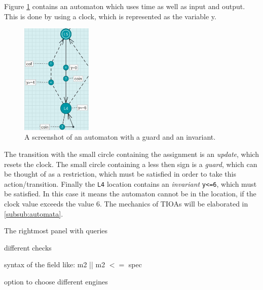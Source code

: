 Figure \ref{fig:ECDAR-guard} contains an automaton which uses time as well as input and output.
This is done by using a clock, which is represented as the variable y.
\begin{figure}[H]
    \centering
    \includegraphics[width=0.3\textwidth]{common/figures/ecdar-guards.jpg}
    \caption{A screenshot of an automaton with a guard and an invariant.}
    \label{fig:ECDAR-guard}
\end{figure}
The transition with the small circle containing the assignment is an \textit{update}, which resets the clock.
The small circle containing a less then sign is a \textit{guard}, which can be thought of as a restriction, which must be satisfied in order to take this action/transition.
Finally the \texttt{L4} location contains an \textit{invariant} \texttt{y<=6}, which must be satisfied. 
In this case it means the automaton cannot be in the location, if the clock value exceeds the value 6.
The mechanics of TIOAs will be elaborated in \ref{subsub:automata}.

The rightmost panel with queries 

different checks

syntax of the field like: m2 || m2 $<=$ spec

option to choose different engines



